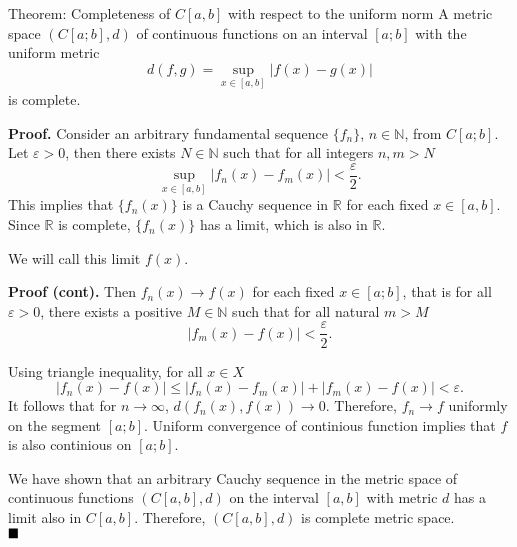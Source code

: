 \documentclass[10pt]{beamer}
\renewcommand{\qed}{\hfill\blacksquare}
\begin{document}
\begin{frame}
	\begin{block}{Theorem: Completeness of \(C[a,b]\) with respect to the uniform norm}
		A metric space \((C[a;b], d)\) of continuous functions on an interval \([a; b]\)
		with the uniform metric
		\[d(f, g) = \sup_{x \in [a,b]}|f(x) - g(x)|\]
		is complete.
	\end{block}

	\textbf{Proof.} Consider an arbitrary fundamental sequence \(\{f_n\}\), \(n \in \mathbb{N}\), from \(C[a;b]\).
	Let \(\varepsilon > 0\), then there exists \(N \in \mathbb{N}\) such that for all integers \(n, m > N\)
	\[\sup_{x \in [a,b]}|f_n(x) - f_m(x)| < \frac{\varepsilon}{2}.\]
	This implies that \(\{f_n(x)\}\) is a Cauchy sequence in \(\mathbb{R}\) for each fixed \(x \in [a, b]\).
	Since \(\mathbb{R}\) is complete, \(\{f_n(x)\}\) has a limit, which is also in \(\mathbb{R}\).
	\vspace{0.3cm}

	We will call this limit \(f(x)\).
\end{frame}

\begin{frame}
	\textbf{Proof (cont).} Then \(f_n(x) \rightarrow f(x)\) for each fixed \(x \in [a;b]\), that is
	for all \(\varepsilon > 0\), there exists a positive \(M \in \mathbb{N}\) such that for all natural \(m > M\)
	\[|f_m(x) - f(x)| < \frac{\varepsilon}{2}.\]

	Using triangle inequality, for all \(x \in X\)
	\[|f_n(x) - f(x)| \le |f_n(x) - f_m(x)| + |f_m(x) - f(x)| < \varepsilon.\]
	It follows that for \(n \rightarrow \infty\), \(d(f_n(x), f(x)) \rightarrow 0\).
	Therefore, \(f_n \rightarrow f\) uniformly on the segment \([a;b]\). Uniform convergence of
	continious function implies that \(f\) is also continious on \([a;b]\).
	\vspace{0.3cm}

	We have shown that an arbitrary Cauchy sequence in the metric space of continuous functions \((C[a, b], d)\)
	on the interval \([a, b]\) with metric \(d\) has a limit also in \(C[a, b]\). Therefore, \((C[a, b], d)\) is
	complete metric space. \\ \(\qed\)
\end{frame}
\end{document}
